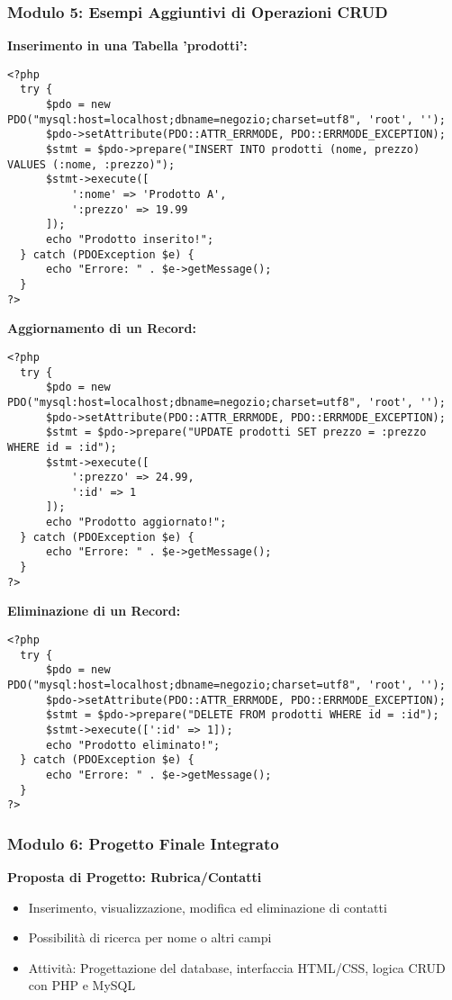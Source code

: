 \documentclass{beamer}
\begin{document}
\begin{frame}[fragile]
\frametitle{Modulo 5: Esempi Aggiuntivi di Operazioni CRUD}
\textbf{Inserimento in una Tabella 'prodotti':}
\begin{lstlisting}
<?php
  try {
      $pdo = new PDO("mysql:host=localhost;dbname=negozio;charset=utf8", 'root', '');
      $pdo->setAttribute(PDO::ATTR_ERRMODE, PDO::ERRMODE_EXCEPTION);
      $stmt = $pdo->prepare("INSERT INTO prodotti (nome, prezzo) VALUES (:nome, :prezzo)");
      $stmt->execute([
          ':nome' => 'Prodotto A',
          ':prezzo' => 19.99
      ]);
      echo "Prodotto inserito!";
  } catch (PDOException $e) {
      echo "Errore: " . $e->getMessage();
  }
?>
\end{lstlisting}
\vspace{0.5em}
\textbf{Aggiornamento di un Record:}
\begin{lstlisting}
<?php
  try {
      $pdo = new PDO("mysql:host=localhost;dbname=negozio;charset=utf8", 'root', '');
      $pdo->setAttribute(PDO::ATTR_ERRMODE, PDO::ERRMODE_EXCEPTION);
      $stmt = $pdo->prepare("UPDATE prodotti SET prezzo = :prezzo WHERE id = :id");
      $stmt->execute([
          ':prezzo' => 24.99,
          ':id' => 1
      ]);
      echo "Prodotto aggiornato!";
  } catch (PDOException $e) {
      echo "Errore: " . $e->getMessage();
  }
?>
\end{lstlisting}
\vspace{0.5em}
\textbf{Eliminazione di un Record:}
\begin{lstlisting}
<?php
  try {
      $pdo = new PDO("mysql:host=localhost;dbname=negozio;charset=utf8", 'root', '');
      $pdo->setAttribute(PDO::ATTR_ERRMODE, PDO::ERRMODE_EXCEPTION);
      $stmt = $pdo->prepare("DELETE FROM prodotti WHERE id = :id");
      $stmt->execute([':id' => 1]);
      echo "Prodotto eliminato!";
  } catch (PDOException $e) {
      echo "Errore: " . $e->getMessage();
  }
?>
\end{lstlisting}
\end{frame}


\begin{frame}
\frametitle{Modulo 6: Progetto Finale Integrato}
\textbf{Proposta di Progetto: Rubrica/Contatti}
\begin{itemize}
    \item Inserimento, visualizzazione, modifica ed eliminazione di contatti
    \item Possibilità di ricerca per nome o altri campi
    \item Attività: Progettazione del database, interfaccia HTML/CSS, logica CRUD con PHP e MySQL
\end{itemize}
\end{frame}
\end{document}
